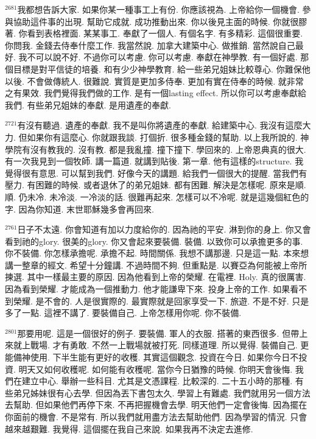 \documentclass{book}
\begin{document}
$^{2681}$我都想告訴大家.
如果你某一種事工上有份.
你應該視為.
上帝給你一個機會.
參與協助這件事的出現.
幫助它成就.
成功推動出來.
你以後見主面的時候.
你就很膠著.
你看到表格裡面.
某某事工.
奉獻了一個人.
有個名字.
有多精彩.
這個很重要.
你問我.
金錢去侍奉什麼工作.
我當然說.
加拿大建築中心.
做推銷.
當然說自己最好.
我不可以說不好.
不過你可以考慮.
你可以考慮.
奉獻在神學教.
有一個好處.
那個目標是對平信徒的培養.
和有少少神學教育.
給一些弟兄姐妹比較尊心.
你難保他以後.
不會做傳統人.
很難說.
實質是更加多侍奉.
更加有實在侍奉的時候.
就非常之有果效.
我們覺得我們做的工作.
是有一個lasting effect.
所以你可以考慮奉獻給我們.
有些弟兄姐妹的奉獻.
是用遺產的奉獻.

$^{2721}$有沒有聽過.
遺產的奉獻.
我不是叫你將遺產的奉獻.
給建築中心.
我沒有這麼大力.
但如果你有這麼心.
你就跟我談.
打個折.
很多種金錢的幫助.
以上我所說的.
神學院有沒有教我的.
沒有教.
都是我亂撞.
撞下撞下.
學回來的.
上帝恩典真的很大.
有一次我見到一個牧師.
講一篇道.
就講到貼後.
第一章.
他有這樣的structure.
我覺得很有意思.
可以幫到我們.
好像今天的講題.
給我們一個很大的提醒.
當我們有壓力.
有困難的時候.
或者退休了的弟兄姐妹.
都有困難.
解決是怎樣呢.
原來是順.
順.
仍未冷.
未冷淡.
一冷淡的話.
很難再起來.
怎樣可以不冷呢.
就是這幾個紅色的字.
因為你知道.
末世耶穌幾多會再回來.

$^{2761}$日子不太遠.
你會知道有加以力度給你的.
因為祂的平安.
淋到你的身上.
你又會看到祂的glory.
很美的glory.
你又會起來要裝備.
裝備.
以致你可以承擔更多的事.
你不裝備.
你怎樣承擔呢.
承擔不起.
時間關係.
我想不講那邊.
只是這一點.
本來想講一整章的經文.
希望十分鐘講.
不過時間不夠.
但重點是.
以賽亞為何能被上帝所揀選.
其中一樣最主要的原因.
因為他看到上帝的榮耀.
在電裡.
Holy.
真的很厲害.
因為看到榮耀.
才能成為一個推動力.
他才能謙卑下來.
投身上帝的工作.
如果看不到榮耀.
是不會的.
人是很實際的.
最實際就是回家享受一下.
旅遊.
不是不好.
只是多了一點.
這裡不講了.
要裝備自己.
上帝怎樣用你呢.
你不裝備.

$^{2801}$那要用呢.
這是一個很好的例子.
要裝備.
軍人的衣服.
搭著的東西很多.
但帶上來就上戰場.
才有勇敢.
不然一上戰場就被打死.
同樣道理.
所以覺得.
裝備自己.
更能備神使用.
下半生能有更好的收穫.
其實這個觀念.
投資在今日.
如果你今日不投資.
明天又如何收穫呢.
如何能有收穫呢.
當你今日猶豫的時候.
你明天會後悔.
我們在建立中心.
舉辦一些科目.
尤其是文憑課程.
比較深的.
二十五小時的那種.
有些弟兄姊妹很有心去學.
但因為丟下書包太久.
學習上有難處.
我們就用另一個方法去幫助.
但如果他們再停下來.
不再把握機會去學.
明天他們一定會後悔.
因為擺在你面前的機會.
不是常有.
所以我們就用盡方法去幫助他們.
因為學習的情況.
只會越來越艱難.
我覺得.
這個擺在我自己來說.
如果我再不決定去進修.
\end{document}
